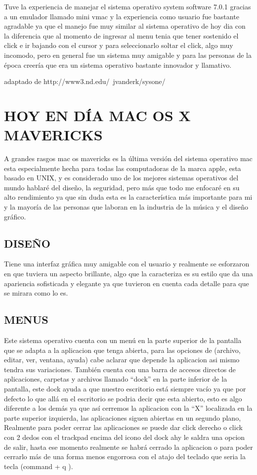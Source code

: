 Tuve la experiencia de manejar el sistema operativo system
software 7.0.1 gracias a un emulador llamado mini vmac y la
experiencia como usuario fue bastante agradable ya que el
manejo fue muy similar al sistema operativo de hoy dia con la
diferencia que al momento de ingresar al menu tenia que tener
sostenido el click e ir bajando con el cursor y para seleccionarlo
soltar el click, algo muy incomodo, pero en general fue un
sistema muy amigable y para las personas de la época creería
que era un sistema operativo bastante innovador y llamativo.

adaptado de http://www3.nd.edu/~jvanderk/sysone/

\section*{HOY EN DÍA MAC OS X MAVERICKS}

A grandes rasgos mac os mavericks es la última versión del
sistema operativo mac esta especialmente hecha para todas las
computadoras de la marca apple, esta basado en UNIX, y es
considerado uno de los mejores sistemas operativos del mundo
hablaré del diseño, la seguridad, pero más que todo me enfocaré
en su alto rendimiento ya que sin duda esta es la característica
más importante para mi y la mayoría de las personas que
laboran en la industria de la música y el diseño gráfico.

\subsection*{DISEÑO}

Tiene una interfaz gráfica muy amigable con el usuario y
realmente se esforzaron en que tuviera un aspecto brillante,
algo que la caracteriza es su estilo que da una apariencia
sofisticada y elegante ya que tuvieron en cuenta cada detalle
para que se mirara como lo es.

\subsection*{MENUS}

Este sistema operativo cuenta con un menú en la parte superior
de la pantalla que se adapta a la aplicacion que tenga abierta,
para las opciones de (archivo, editar, ver, ventana, ayuda) cabe
aclarar que depende la aplicacion asi mismo tendra sus
variaciones. También cuenta con una barra de accesos directos
de aplicaciones, carpetas y archivos llamado “dock” en la parte
inferior de la pantalla, este dock ayuda a que nuestro escritorio
está siempre vacío ya que por defecto lo que allá en el escritorio
se podria decir que esta abierto, esto es algo diferente a los
demás ya que así cerremos la aplicacion con la “X” localizada en
la parte superior izquierda, las aplicaciones siguen abiertas en
un segundo plano, Realmente para poder cerrar las aplicaciones se puede dar click
derecho o click con 2 dedos con el trackpad encima del icono del
dock ahy le saldra una opcion de salir, hasta ese momento
realmente se habrá cerrado la aplicacion o para poder cerrarlo
más de una forma menos engorrosa con el atajo del teclado que
seria la tecla (command + q ).

